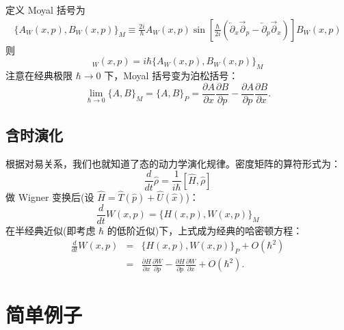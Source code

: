\documentclass[10pt,UTF8]{ctexart}
\begin{document}
定义 Moyal 括号为
\begin{eqnarray}
	\{A_W(x,p),B_W(x,p)\}_M \equiv \frac{2i}{\hbar} A_W(x,p) \sin\left[\frac{\hbar}{2i}(\overleftarrow{\partial}_x\overrightarrow{\partial}_p-\overleftarrow{\partial}_p\overrightarrow{\partial}_x)\right] B_W(x,p)
\end{eqnarray}
则
\begin{equation}
	[A,B]_W(x,p) = i\hbar \{A_W(x,p),B_W(x,p)\}_M
\end{equation}
注意在经典极限 $\hbar \rightarrow 0$ 下，Moyal 括号变为泊松括号：
\begin{equation}
	\lim_{\hbar \rightarrow 0} \{A,B\}_M
	= \{A,B\}_P
	= \frac{\partial A}{\partial x} \frac{\partial B}{\partial p} - \frac{\partial A}{\partial p} \frac{\partial B}{\partial x}.
\end{equation}


\subsection*{含时演化}
\noindent
根据对易关系，我们也就知道了态的动力学演化规律。密度矩阵的算符形式为：
\begin{equation}
	\frac{d}{dt}\hat \rho = \frac{1}{i\hbar} [\hat H, \hat \rho]
\end{equation}
做 Wigner 变换后(设 $\hat H = \hat T(\hat p) + \hat U(\hat x)$)：
\begin{equation}
	\frac{d}{dt}W(x,p) = \{H(x,p),W(x,p) \}_M
\end{equation}
在半经典近似(即考虑 $\hbar$ 的低阶近似)下，上式成为经典的哈密顿方程：
\begin{eqnarray}
	\frac{d}{dt}W(x,p) 
	&=& \{H(x,p),W(x,p) \}_P + O(\hbar^2) \\
	&=& \frac{\partial H}{\partial x} \frac{\partial W}{\partial p} - \frac{\partial H}{\partial p} \frac{\partial W}{\partial x} + O(\hbar^2).
\end{eqnarray}



\section*{简单例子}
\end{document}
